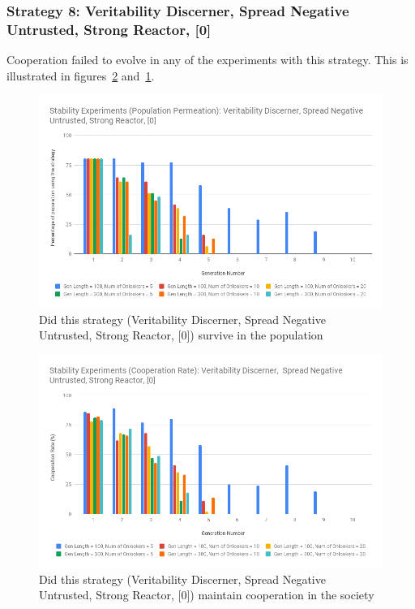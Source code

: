 \documentclass[]{final_report}
\begin{document}
\subsubsection{Strategy 8: Veritability Discerner, Spread Negative Untrusted, Strong Reactor, [0]} 
Cooperation failed to evolve in any of the experiments with this strategy. This is illustrated in figures~\ref{fig:vdsnusr0Coop} and~\ref{fig:vdsnusr0Pop}.
\begin{figure}
\begin{framed}
	\includegraphics[width=\textwidth]{vdsnusr0Pop.png}
	\caption{Did this strategy (Veritability Discerner, Spread Negative Untrusted, Strong Reactor, [0]) survive in the population}
	\label{fig:vdsnusr0Pop}
\end{framed}
\end{figure}
\begin{figure}
\begin{framed}
	\includegraphics[width=\textwidth]{vdsnusr0Coop.png}
	\caption{Did this strategy (Veritability Discerner, Spread Negative Untrusted, Strong Reactor, [0]) maintain cooperation in the society}
	\label{fig:vdsnusr0Coop}
\end{framed}
\end{figure}
\end{document}
